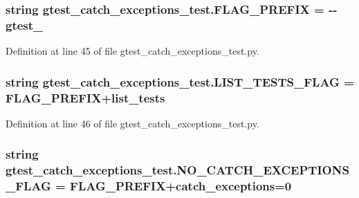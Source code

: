 \subsubsection[{\texorpdfstring{F\+L\+A\+G\+\_\+\+P\+R\+E\+F\+IX}{FLAG_PREFIX}}]{\setlength{\rightskip}{0pt plus 5cm}string gtest\+\_\+catch\+\_\+exceptions\+\_\+test.\+F\+L\+A\+G\+\_\+\+P\+R\+E\+F\+IX = \textquotesingle{}-\/-\/gtest\+\_\+\textquotesingle{}}\hypertarget{namespacegtest__catch__exceptions__test_a2d40f89077ec9fdb51008c263148315f}{}\label{namespacegtest__catch__exceptions__test_a2d40f89077ec9fdb51008c263148315f}


Definition at line 45 of file gtest\+\_\+catch\+\_\+exceptions\+\_\+test.\+py.

\subsubsection[{\texorpdfstring{L\+I\+S\+T\+\_\+\+T\+E\+S\+T\+S\+\_\+\+F\+L\+AG}{LIST_TESTS_FLAG}}]{\setlength{\rightskip}{0pt plus 5cm}string gtest\+\_\+catch\+\_\+exceptions\+\_\+test.\+L\+I\+S\+T\+\_\+\+T\+E\+S\+T\+S\+\_\+\+F\+L\+AG = {\bf F\+L\+A\+G\+\_\+\+P\+R\+E\+F\+IX}+\textquotesingle{}list\+\_\+tests\textquotesingle{}}\hypertarget{namespacegtest__catch__exceptions__test_a68601cbcd48065a2f656eb8552784f0c}{}\label{namespacegtest__catch__exceptions__test_a68601cbcd48065a2f656eb8552784f0c}


Definition at line 46 of file gtest\+\_\+catch\+\_\+exceptions\+\_\+test.\+py.

\subsubsection[{\texorpdfstring{N\+O\+\_\+\+C\+A\+T\+C\+H\+\_\+\+E\+X\+C\+E\+P\+T\+I\+O\+N\+S\+\_\+\+F\+L\+AG}{NO_CATCH_EXCEPTIONS_FLAG}}]{\setlength{\rightskip}{0pt plus 5cm}string gtest\+\_\+catch\+\_\+exceptions\+\_\+test.\+N\+O\+\_\+\+C\+A\+T\+C\+H\+\_\+\+E\+X\+C\+E\+P\+T\+I\+O\+N\+S\+\_\+\+F\+L\+AG = {\bf F\+L\+A\+G\+\_\+\+P\+R\+E\+F\+IX}+\textquotesingle{}catch\+\_\+exceptions=0\textquotesingle{}}\hypertarget{namespacegtest__catch__exceptions__test_af3e2719448df6b24d78c870e5b586e8b}{}\label{namespacegtest__catch__exceptions__test_af3e2719448df6b24d78c870e5b586e8b}



